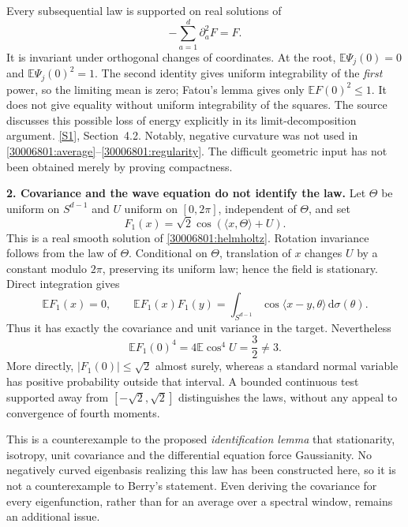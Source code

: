 \documentclass[11pt,a4paper]{article}
\newcommand{\E}{\mathbb{E}}
\newcommand{\dd}{\,\mathrm d}
\newcommand{\sref}[2]{\hyperlink{source:#1:#2}{[S#2]}}
\numberwithin{equation}{section}
\begin{document}
Every subsequential law is supported on real solutions of
\begin{equation}\label{30006801:helmholtz}
 -\sum_{a=1}^d\partial_a^2F=F.
\end{equation}
It is invariant under orthogonal changes of coordinates. At the root,
$\E\Psi_j(0)=0$ and $\E\Psi_j(0)^2=1$. The second identity gives uniform
integrability of the \emph{first} power, so the limiting mean is zero;
Fatou's lemma gives only $\E F(0)^2\leq1$. It does not give equality
without uniform integrability of the squares. The source discusses this
possible loss of energy explicitly in its limit-decomposition argument.
\sref{30006801}{1}, Section~4.2. Notably, negative curvature was not used in
\eqref{30006801:average}--\eqref{30006801:regularity}. The difficult geometric input
has not been obtained merely by proving compactness.

\textbf{2. Covariance and the wave equation do not identify the law.}
Let $\Theta$ be uniform on $S^{d-1}$ and $U$ uniform on $[0,2\pi]$,
independent of $\Theta$, and set
\begin{equation}\label{30006801:onewave}
 F_1(x)=\sqrt2\cos(\langle x,\Theta\rangle+U).
\end{equation}
This is a real smooth solution of \eqref{30006801:helmholtz}. Rotation
invariance follows from the law of $\Theta$. Conditional on $\Theta$,
translation of $x$ changes $U$ by a constant modulo $2\pi$, preserving its
uniform law; hence the field is stationary. Direct integration gives
\[
 \E F_1(x)=0,\qquad
 \E F_1(x)F_1(y)=\int_{S^{d-1}}
       \cos\langle x-y,\theta\rangle\dd\sigma(\theta).
\]
Thus it has exactly the covariance and unit variance in the target.
Nevertheless
\begin{equation}\label{30006801:fourth}
 \E F_1(0)^4=4\E\cos^4U=\frac32\ne3.
\end{equation}
More directly, $|F_1(0)|\leq\sqrt2$ almost surely, whereas a standard
normal variable has positive probability outside that interval. A bounded
continuous test supported away from $[-\sqrt2,\sqrt2]$ distinguishes the
laws, without any appeal to convergence of fourth moments.

This is a counterexample to the proposed \emph{identification lemma}
that stationarity, isotropy, unit covariance and the differential equation
force Gaussianity. No negatively curved eigenbasis realizing this law has
been constructed here, so it is not a counterexample to Berry's statement.
Even deriving the covariance for every eigenfunction, rather than for an
average over a spectral window, remains an additional issue.
\end{document}
